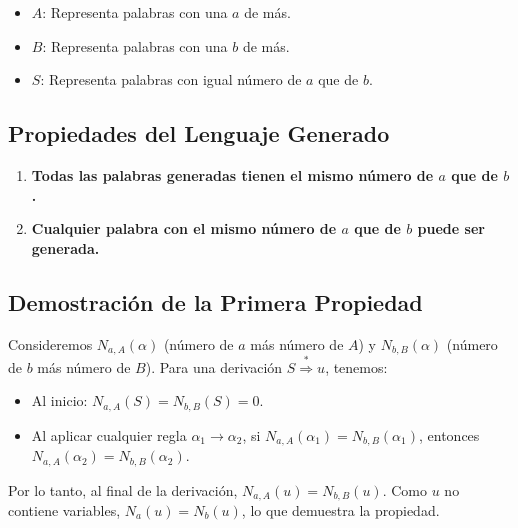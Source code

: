 \documentclass[12pt]{report} %
\providecommand{\tightlist}{%
  \setlength{\itemsep}{0pt}\setlength{\parskip}{0pt}}
\begin{document}
\begin{itemize}
\tightlist
\item
  \(A\): Representa palabras con una \(a\) de más.\\
\item
  \(B\): Representa palabras con una \(b\) de más.\\
\item
  \(S\): Representa palabras con igual número de \(a\) que de \(b\).
\end{itemize}

\hypertarget{propiedades-del-lenguaje-generado}{%
\subsection{Propiedades del Lenguaje
Generado}\label{propiedades-del-lenguaje-generado}}

\begin{enumerate}
\def\labelenumi{\arabic{enumi}.}
\tightlist
\item
  \textbf{Todas las palabras generadas tienen el mismo número de \(a\)
  que de \(b\).}\\
\item
  \textbf{Cualquier palabra con el mismo número de \(a\) que de \(b\)
  puede ser generada.}
\end{enumerate}

\hypertarget{demostraciuxf3n-de-la-primera-propiedad}{%
\subsection{Demostración de la Primera
Propiedad}\label{demostraciuxf3n-de-la-primera-propiedad}}

\begin{demostracion}
Consideremos $N_{a,A}(\alpha)$ (número de $a$ más número de $A$) y $N_{b,B}(\alpha)$ (número de $b$ más número de $B$). Para una derivación $S \overset{*}{\Rightarrow} u$, tenemos:  

\begin{itemize}
    \item Al inicio: $N_{a,A}(S) = N_{b,B}(S) = 0$.  
    \item Al aplicar cualquier regla $\alpha_1 \to \alpha_2$, si $N_{a,A}(\alpha_1) = N_{b,B}(\alpha_1)$, entonces $N_{a,A}(\alpha_2) = N_{b,B}(\alpha_2)$.  
\end{itemize}

Por lo tanto, al final de la derivación, $N_{a,A}(u) = N_{b,B}(u)$. Como $u$ no contiene variables, $N_a(u) = N_b(u)$, lo que demuestra la propiedad.
\end{demostracion}
\end{document}
